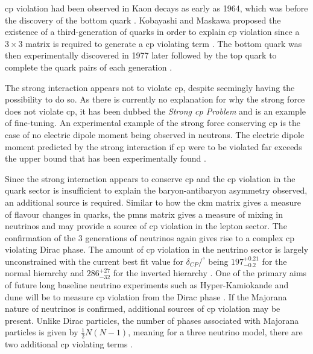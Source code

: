 \gls{cp} violation had been observed in Kaon decays as early as 1964, which was before the discovery of the bottom quark \cite{Cronin_and_Fitch_experiment}. Kobayashi and Maskawa proposed the existence of a third-generation of quarks in order to explain \gls{cp} violation since a $3\times3$ matrix is required to generate a \gls{cp} violating term \cite{CP_Violation_in_the_Renormalizable_Theory_of_Weak_Interaction}. The bottom quark was then experimentally discovered in 1977 later followed by the top quark to complete the quark pairs of each generation \cite{bottom_quark_discovery}. 

The strong interaction appears not to violate \gls{cp}, despite seemingly having the possibility to do so. As there is currently no explanation for why the strong force does not violate \gls{cp}, it has been dubbed the \textit{Strong \gls{cp} Problem} and is an example of fine-tuning. An experimental example of the strong force conserving \gls{cp} is the case of no electric dipole moment being observed in neutrons. The electric dipole moment predicted by the strong interaction if \gls{cp} were to be violated far exceeds the upper bound that has been experimentally found \cite{strong_CP_problem}.

Since the strong interaction appears to conserve \gls{cp} and the \gls{cp} violation in the quark sector is insufficient to explain the baryon-antibaryon asymmetry observed, an additional source is required. Similar to how the \gls{ckm} matrix gives a measure of flavour changes in quarks, the \gls{pmns} matrix gives a measure of mixing in neutrinos and may provide a source of \gls{cp} violation in the lepton sector. The confirmation of the 3 generations of neutrinos again gives rise to a complex \gls{cp} violating Dirac phase. The amount of \gls{cp} violation in the neutrino sector is largely unconstrained with the current best fit value for $\delta_{CP}/^\circ$ being $197^{+0.21}_{-0.2}$ for the normal hierarchy and $286^{+27}_{-32}$ for the inverted hierarchy \cite{nu_ft_v2}. One of the primary aims of future long baseline neutrino experiments such as Hyper-Kamiokande and \gls{dune} will be to measure \gls{cp} violation from the Dirac phase \cite{Hyper_Kamiokande_design_report}\cite{DUNE_design_report}. If the Majorana nature of neutrinos is confirmed, additional sources of \gls{cp} violation may be present. Unlike Dirac particles, the number of phases associated with Majorana particles is given by $\frac{1}{2}N(N-1)$, meaning for a three neutrino model, there are two additional \gls{cp} violating terms \cite{Majorana_neutrinos_and_other_Majorana_particles_Theory_and_experiment}.


